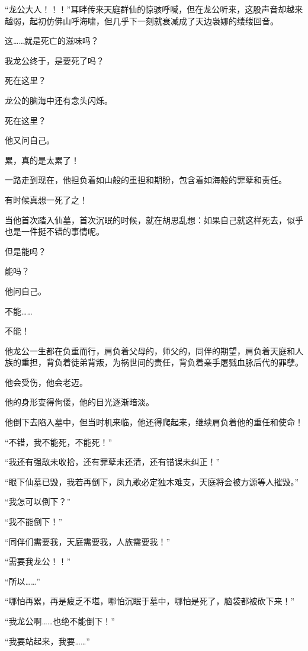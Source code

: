 
\begin{this_body}

“龙公大人！！！”耳畔传来天庭群仙的惊骇呼喊，但在龙公听来，这股声音却越来越弱，起初仿佛山呼海啸，但几乎下一刻就衰减成了天边袅娜的缕缕回音。

这……就是死亡的滋味吗？

我龙公终于，是要死了吗？

死在这里？

龙公的脑海中还有念头闪烁。

死在这里？

他又问自己。

累，真的是太累了！

一路走到现在，他担负着如山般的重担和期盼，包含着如海般的罪孽和责任。

有时候真想一死了之！

当他首次踏入仙墓，首次沉眠的时候，就在胡思乱想：如果自己就这样死去，似乎也是一件挺不错的事情呢。

但是能吗？

能吗？

他问自己。

不能……

不能！

他龙公一生都在负重而行，肩负着父母的，师父的，同伴的期望，肩负着天庭和人族的重担，背负着徒弟背叛，为祸世间的责任，背负着亲手屠戮血脉后代的罪孽。

他会受伤，他会老迈。

他的身形变得佝偻，他的目光逐渐暗淡。

他倒下去陷入墓中，但当时机来临，他还得爬起来，继续肩负着他的重任和使命！

“不错，我不能死，不能死！”

“我还有强敌未收拾，还有罪孽未还清，还有错误未纠正！”

“眼下仙墓已毁，我若再倒下，凤九歌必定独木难支，天庭将会被方源等人摧毁。”

“我怎可以倒下？”

“我不能倒下！”

“同伴们需要我，天庭需要我，人族需要我！”

“需要我龙公！！”

“所以……”

“哪怕再累，再是疲乏不堪，哪怕沉眠于墓中，哪怕是死了，脑袋都被砍下来！”

“我龙公啊……也绝不能倒下！”

“我要站起来，我要……”


\end{this_body}
